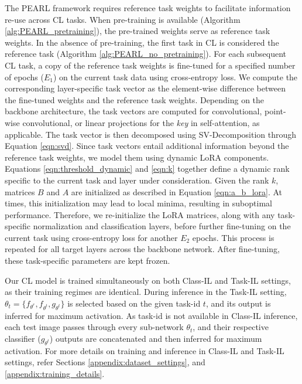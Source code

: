 \documentclass[10pt]{article} %
\begin{document}
The PEARL framework requires reference task weights to facilitate information re-use across CL tasks. When pre-training is available (Algorithm \ref{alg:PEARL_pretraining}), the pre-trained weights serve as reference task weights. In the absence of pre-training, the first task in CL is considered the reference task (Algorithm \ref{alg:PEARL_no_pretraining}). For each subsequent CL task, a copy of the reference task weights is fine-tuned for a specified number of epochs ($E_1$) on the current task data using cross-entropy loss. We compute the corresponding layer-specific task vector as the element-wise difference between the fine-tuned weights and the reference task weights. Depending on the backbone architecture, the task vectors are computed for convolutional, point-wise convolutional, or linear projections for the \textit{key} in self-attention, as applicable. The task vector is then decomposed using SV-Decomposition through Equation \ref{eqn:svd}. Since task vectors entail additional information beyond the reference task weights, we model them using dynamic LoRA components. Equations \ref{eqn:threshold_dynamic} and \ref{eqn:k} together define a dynamic rank specific to the current task and layer under consideration. Given the rank $k$, matrices $B$ and $A$ are initialized as described in Equation \ref{eqn:a_b_lora}. At times, this initialization may lead to local minima, resulting in suboptimal performance. Therefore, we re-initialize the LoRA matrices, along with any task-specific normalization and classification layers, before further fine-tuning on the current task using cross-entropy loss for another $E_2$ epochs. This process is repeated for all target layers across the backbone network. After fine-tuning, these task-specific parameters are kept frozen. 

Our CL model is trained simultaneously on both Class-IL and Task-IL settings, as their training regimes are identical. During
inference in the Task-IL setting, $\theta_t =  \{f_{\theta^{r}}, f_{\theta^{t}}, g_{\theta^{t}} \}$ is selected based on the given task-id $t$, and its output is inferred for maximum activation. 
As task-id is not available in Class-IL inference,  each test image passes through every sub-network $\theta_t$, and their respective classifier ($g_{\theta^{t}}$) outputs are
concatenated and then inferred for maximum activation. For more details on training and inference in Class-IL and Task-IL settings, refer Sections \ref{appendix:dataset_settings}, and \ref{appendix:training_details}.
\end{document}

